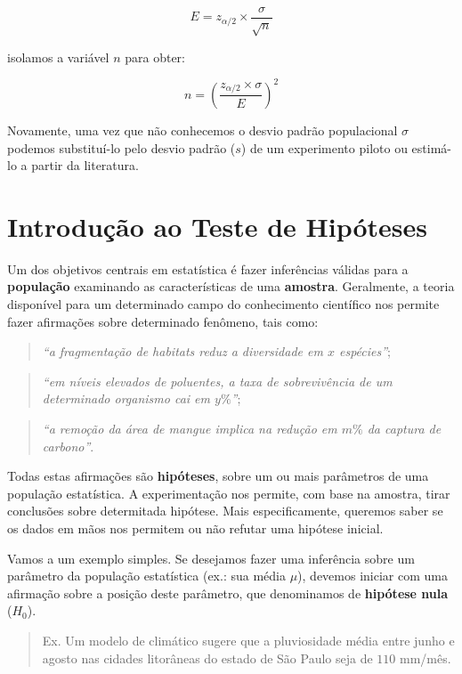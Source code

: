 \documentclass[
]{book}
\begin{document}
\[E = z_{\alpha/2} \times \frac{\sigma}{\sqrt{n}}\]

isolamos a variável \(n\) para obter:

\[n = (\frac{ z_{\alpha/2} \times \sigma}{E})^2\]

Novamente, uma vez que não conhecemos o desvio padrão populacional \(\sigma\) podemos substituí-lo pelo desvio padrão (\(s\)) de um experimento piloto ou estimá-lo a partir da literatura.

\hypertarget{th}{%
\chapter{Introdução ao Teste de Hipóteses}\label{th}}

Um dos objetivos centrais em estatística é fazer inferências válidas para a \textbf{população} examinando as características de uma \textbf{amostra}. Geralmente, a teoria disponível para um determinado campo do conhecimento científico nos permite fazer afirmações sobre determinado fenômeno, tais como:

\begin{quote}
\emph{``a fragmentação de habitats reduz a diversidade em \(x\) espécies''};
\end{quote}

\begin{quote}
\emph{``em níveis elevados de poluentes, a taxa de sobrevivência de um determinado organismo cai em \(y\%\)''};
\end{quote}

\begin{quote}
\emph{``a remoção da área de mangue implica na redução em \(m\%\) da captura de carbono''}.
\end{quote}

Todas estas afirmações são \textbf{hipóteses}, sobre um ou mais parâmetros de uma população estatística. A experimentação nos permite, com base na amostra, tirar conclusões sobre determitada hipótese. Mais especificamente, queremos saber se os dados em mãos nos permitem ou não refutar uma hipótese inicial.

Vamos a um exemplo simples. Se desejamos fazer uma inferência sobre um parâmetro da população estatística (ex.: sua média \(\mu\)), devemos iniciar com uma afirmação sobre a posição deste parâmetro, que denominamos de \textbf{hipótese nula} (\(H_0\)).

\begin{quote}
Ex. Um modelo de climático sugere que a pluviosidade média entre junho e agosto nas cidades litorâneas do estado de São Paulo seja de \(110\) mm/mês.
\end{quote}
\end{document}
